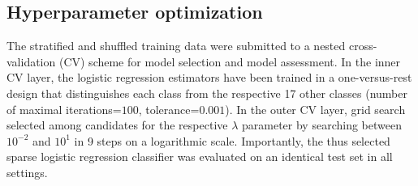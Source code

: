 \documentclass{article}
\begin{document}
\subsection{Hyperparameter optimization}
The stratified and shuffled training data were submitted
to a nested cross-validation (CV) scheme
for model selection and model assessment.
In the inner CV layer, the logistic regression estimators
have been trained in a one-versus-rest design that
distinguishes each class from
the respective 17 other classes
(number of maximal iterations=$100$, tolerance=$0.001$).
In the outer CV layer, grid search
selected among candidates for the respective $\lambda$ parameter
by searching between $10^{-2}$ and $10^{1}$ in 9 steps on a logarithmic scale.
Importantly, the thus selected sparse logistic regression classifier was
evaluated on an identical test set in all settings.
\end{document}
